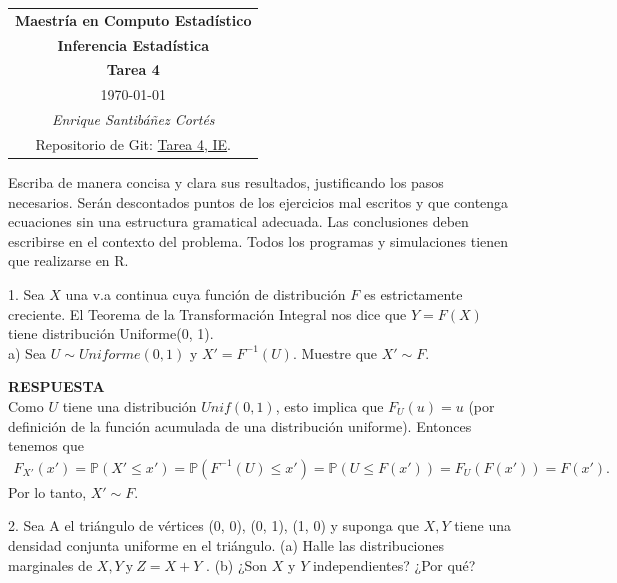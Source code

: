 \documentclass[11pt,letterpaper]{article}
\newcommand{\mP}{\mathbb{P}}
\newcommand{\res}{\textbf{RESPUESTA}\\}
\begin{document}
\begin{table}[ht]
\centering
\begin{tabular}{c}
\textbf{Maestría en Computo Estadístico}\\
\textbf{Inferencia Estadística} \\
\textbf{Tarea 4}\\
\today \\
\emph{Enrique Santibáñez Cortés}\\
Repositorio de Git: \href{https://github.com/Enriquesec/Inferencia_Estad-stica/tree/master/Tareas/Tarea_4}{Tarea 4, IE}.
\end{tabular}
\end{table}
Escriba de manera concisa y clara sus resultados, justificando los pasos necesarios. Serán descontados puntos de los ejercicios mal escritos y que contenga ecuaciones sin una estructura gramatical adecuada. Las conclusiones deben escribirse en el contexto del problema. Todos los programas y
simulaciones tienen que realizarse en R.

1. Sea $X$ una v.a continua cuya función de distribución $F$ es estrictamente creciente. El Teorema
de la Transformación Integral nos dice que $Y=F(X)$ tiene distribución Uniforme(0, 1).\\

a) Sea $U\sim Uniforme(0, 1)$ y $X'=F ^{-1}(U)$. Muestre que $X' \sim F$.

\res Como $U$ tiene una distribución $Unif(0,1)$, esto implica que $F_U(u)=u$ (por definición de la función acumulada de una distribución uniforme). Entonces tenemos que 
\begin{align*}
F_{X'}(x')=\mP(X'\leq x')=\mP(F^{-1}(U)\leq x')= \mP(U\leq F(x'))= F_U(F(x'))=F(x').
\end{align*}
Por lo tanto, $X'\sim F.$

2. Sea A el triángulo de vértices (0, 0), (0, 1), (1, 0) y suponga que $X, Y$ tiene una densidad conjunta uniforme en el triángulo. (a) Halle las distribuciones marginales de $X, Y \ \text{y}\ Z =X + Y$ . (b) ¿Son $X$ y $Y$ independientes? ¿Por qué?
\end{document}
